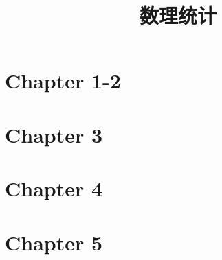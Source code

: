 \documentclass{../mynote}
\title{数理统计}
\begin{document}
\tableofcontents

\chapter{Chapter 1-2}


\chapter{Chapter 3}


\chapter{Chapter 4}


\chapter{Chapter 5}

\end{document}
